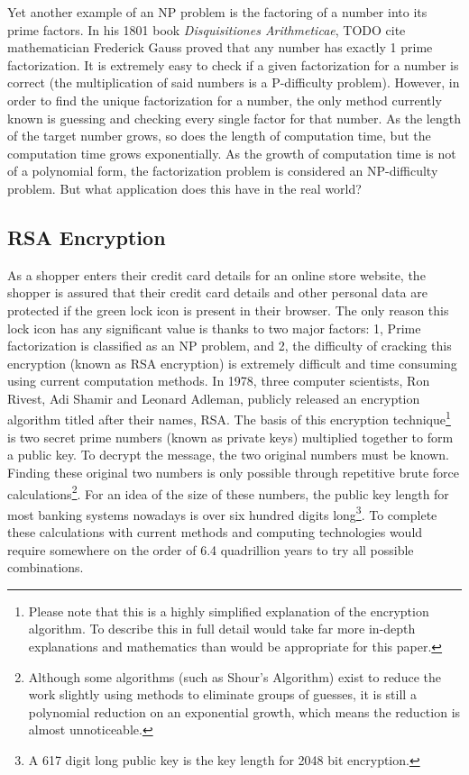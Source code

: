 \documentclass[10pt,journal,compsoc]{IEEEtran}
\begin{document}
Yet another example of an NP problem is the factoring of a number into its prime factors. In his 1801 book \textit{Disquisitiones Arithmeticae}, TODO cite mathematician Frederick Gauss proved that any number has exactly 1 prime factorization. It is extremely easy to check if a given factorization for a number is correct (the multiplication of said numbers is a P-difficulty problem). However, in order to find the unique factorization for a number, the only method currently known is guessing and checking every single factor for that number. As the length of the target number grows, so does the length of computation time, but the computation time grows exponentially. As the growth of computation time is not of a polynomial form, the factorization problem is considered an NP-difficulty problem. But what application does this have in the real world?

\subsection{RSA Encryption}
As a shopper enters their credit card details for an online store website, the shopper is assured that their credit card details and other personal data are protected if the green lock icon is present in their browser. The only reason this lock icon has any significant value is thanks to two major factors: 1, Prime factorization is classified as an NP problem, and 2, the difficulty of cracking this encryption (known as RSA encryption) is extremely difficult and time consuming using current computation methods. In 1978, three computer scientists, Ron Rivest, Adi Shamir and Leonard Adleman, publicly released an encryption algorithm titled after their names, RSA. The basis of this encryption technique\footnote{Please note that this is a highly simplified explanation of the encryption algorithm. To describe this in full detail would take far more in-depth explanations and mathematics than would be appropriate for this paper.} is two secret prime numbers (known as private keys) multiplied together to form a public key. To decrypt the message, the two original numbers must be known. Finding these original two numbers is only possible through repetitive brute force calculations\footnote{Although  some algorithms (such as Shour's Algorithm) exist to reduce the work slightly using methods to eliminate groups of guesses, it is still a polynomial reduction on an exponential growth, which means the reduction is almost unnoticeable.}. For an idea of the size of these numbers, the public key length for most banking systems nowadays is over six hundred digits long\footnote{A 617 digit long public key is the key length for 2048 bit encryption.}\cite{Numberphile}. To complete these calculations with current  methods and computing technologies  would require somewhere on the order of 6.4 quadrillion years to try all possible combinations. 
\end{document}
